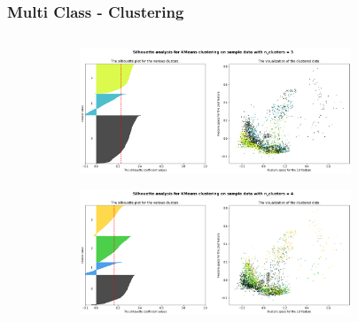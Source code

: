 \documentclass[aspectratio=169,11pt,hyperref={colorlinks=true}]{beamer}
\begin{document}
\begin{frame}
  \frametitle{Multi Class - Clustering}
  \begin{columns}
    \begin{table}[h!]
      \begin{center}
      \end{center}
    \end{table}
    \begin{table}[h!]
      \begin{center}
      \end{center}
    \end{table}
    \begin{center}
     \begin{figure}
      \includegraphics[width=0.8\textwidth]{graphs/silhouette_multiclass_3.png}
      \end{figure}
      \begin{figure}
       \includegraphics[width=0.8\textwidth]{graphs/silhouette_multiclass_4.png}
       \end{figure}
    \end{center}
  \end{columns}
\end{frame}
\end{document}
